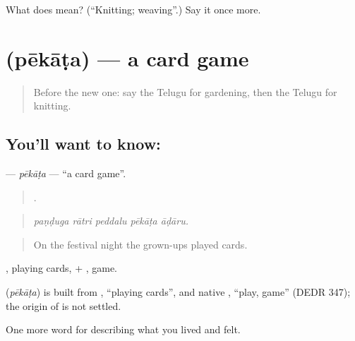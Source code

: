 \begin{tcolorbox}[breakable,colback=teal!4,colframe=teal!35!black,title={Before you move on}]
What does  mean? (\textquotedblleft{}Knitting; weaving\textquotedblright{}.) Say it once more.
\end{tcolorbox}
\section[\texorpdfstring{\te{పేకాట} (pēkāṭa)}{పేకాట (pēkāṭa)}]{ (pēkāṭa) — a card game}

\label{lesson:TE-C536-pekata}



\begin{quote}
Before the new one: say the Telugu for gardening, then the Telugu for knitting.
\end{quote}

\subsection*{You'll want to know: }
\textbf{} — \emph{pēkāṭa} — \textquotedblleft{}a card game\textquotedblright{}.

\begin{quote}
    .
\end{quote}

\begin{quote}
\emph{paṇḍuga rātri peddalu pēkāṭa āḍāru.}
\end{quote}

\begin{quote}
On the festival night the grown-ups played cards.
\end{quote}

, playing cards, + , game.

\begin{cousinweb}
\textbf{} (\emph{pēkāṭa}) is built from , \textquotedblleft{}playing cards\textquotedblright{}, and native , \textquotedblleft{}play, game\textquotedblright{} (DEDR 347); the origin of  is not settled.
\end{cousinweb}

\begin{grammarlens}[title={What you've built}]
One more word for describing what you lived and felt.
\end{grammarlens}

